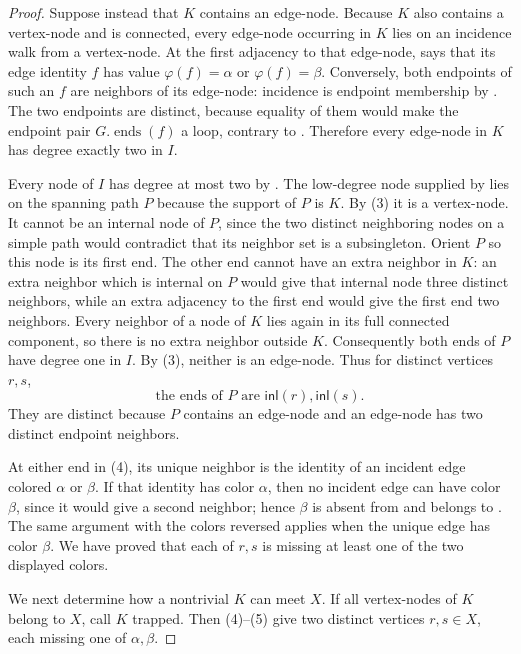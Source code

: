 \begin{proof}
Suppose instead that $K$ contains an edge-node.  Because $K$ also contains
a vertex-node and is connected, every edge-node occurring in $K$ lies on
an incidence walk from a vertex-node.  At the first adjacency to that
edge-node,  says that its edge identity
$f$ has value $\varphi(f)=\alpha$ or $\varphi(f)=\beta$.  Conversely,
both endpoints of such an $f$ are neighbors of its edge-node: incidence
is endpoint membership by .  The two endpoints are
distinct, because equality of them would make the endpoint pair
$G.\operatorname{ends}(f)$ a loop, contrary to
.  Therefore every edge-node in $K$ has
degree exactly two in $I$.                                      

Every node of $I$ has degree at most two by
.  The low-degree node supplied
by  lies on the spanning path $P$ because
the support of $P$ is $K$.  By (3) it is a vertex-node.  It cannot be an
internal node of $P$, since the two distinct neighboring nodes on a simple
path would contradict that its neighbor set is a subsingleton.  Orient
$P$ so this node is its first end.  The other end cannot have an extra
neighbor in $K$: an extra neighbor which is internal on $P$ would give
that internal node three distinct neighbors, while an extra adjacency to
the first end would give the first end two neighbors.  Every neighbor of
a node of $K$ lies again in its full connected component, so there is no
extra neighbor outside $K$.  Consequently both ends of $P$ have degree
one in $I$.  By (3), neither is an edge-node.  Thus for distinct vertices
$r,s$,
\[
       \text{the ends of }P\text{ are }\mathsf{inl}(r),
       \mathsf{inl}(s).                                      \tag{4}
\]
They are distinct because $P$ contains an edge-node and an edge-node has
two distinct endpoint neighbors.

At either end in (4), its unique neighbor is the identity of an incident
edge colored $\alpha$ or $\beta$.  If that identity has color $\alpha$,
then no incident edge can have color $\beta$, since it would give a second
neighbor; hence $\beta$ is absent from  and belongs
to .  The same argument with the colors reversed
applies when the unique edge has color $\beta$.  We have proved that each
of $r,s$ is missing at least one of the two displayed colors.             

We next determine how a nontrivial $K$ can meet $X$.  If all vertex-nodes
of $K$ belong to $X$, call $K$ trapped.  Then (4)--(5) give two distinct
vertices $r,s\in X$, each missing one of $\alpha,\beta$.                  


\end{proof}
